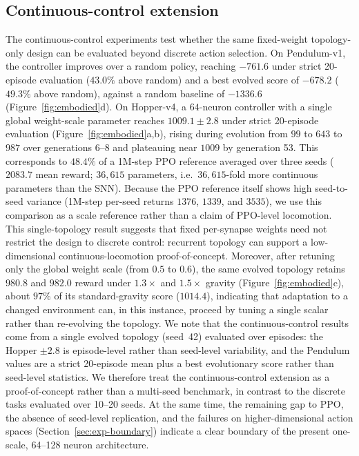 \documentclass[10pt]{article}
\begin{document}
\subsection{Continuous-control extension}
\label{sec:exp-continuous}

The continuous-control experiments test whether the same fixed-weight
topology-only design can be evaluated beyond discrete action selection. On
Pendulum-v1, the controller improves over a random policy, reaching $-761.6$
under strict 20-episode evaluation ($43.0\%$ above random) and a best evolved
score of $-678.2$ ($49.3\%$ above random), against a random
baseline of $-1336.6$ (Figure~\ref{fig:embodied}d). On Hopper-v4, a $64$-neuron
controller with a single global weight-scale parameter reaches $1009.1\pm2.8$
under strict 20-episode evaluation (Figure~\ref{fig:embodied}a,b), rising during
evolution from $99$ to $643$ to $987$ over generations 6--8 and plateauing near
$1009$ by generation 53. This corresponds to $48.4\%$ of a 1M-step PPO reference
averaged over three seeds ($2083.7$ mean reward; $36{,}615$ parameters, i.e.\
$36{,}615$-fold more continuous parameters than the SNN). Because the PPO
reference itself shows high seed-to-seed variance (1M-step per-seed returns
$1376$, $1339$, and $3535$), we use this comparison as a scale reference rather
than a claim of PPO-level locomotion. This single-topology result suggests that
fixed per-synapse weights need not restrict the design to discrete control:
recurrent topology can support a low-dimensional continuous-locomotion
proof-of-concept. Moreover, after retuning only the global weight scale (from
$0.5$ to $0.6$), the same evolved topology retains $980.8$ and $982.0$ reward
under $1.3\times$ and $1.5\times$ gravity (Figure~\ref{fig:embodied}c), about
$97\%$ of its standard-gravity score ($1014.4$), indicating that adaptation to a
changed environment can, in this instance, proceed by tuning a single scalar
rather than re-evolving the topology. We note that the continuous-control results come from a single evolved
topology (seed~42) evaluated over episodes: the Hopper $\pm2.8$ is episode-level
rather than seed-level variability, and the Pendulum values are a strict
20-episode mean plus a best evolutionary score rather than seed-level statistics.
We therefore treat the continuous-control extension as a proof-of-concept rather
than a multi-seed benchmark, in contrast to the discrete tasks evaluated over
10--20 seeds. At the
same time, the remaining gap to PPO, the absence of seed-level replication, and
the failures on higher-dimensional action spaces (Section~\ref{sec:exp-boundary})
indicate a clear boundary of the present one-scale, 64--128 neuron architecture.
\end{document}
